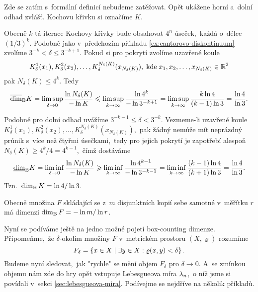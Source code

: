 \begin{example}\label{ex:kochova-krivka}
    Zde se zatím s~formální definicí nebudeme zatěžovat. Opět ukážene horní a~dolní odhad zvlášť. Kochovu křivku si označíme $K$.

    Obecně $k$-tá iterace Kochovy křivky bude obsahovat $4^n$ úseček,~každá o~délce $(1/3)^k$. Podobně jako v~předchozím příkladu \ref{ex:cantorovo-diskontinuum} zvolíme $3^{-k}<\delta\leqslant 3^{-k+1}$. Pokud si pro pokrytí zvolíme uzavřené koule
    \[K_\delta^1(x_1),K_\delta^2(x_2),\ldots,K_\delta^{N_\delta(K)}(x_{N_\delta(K)}),\;\text{kde}\;x_1,x_2,\ldots,x_{N_\delta(K)}\in\mathbb{R}^2\]
    pak $N_\delta(K)\leqslant 4^k$. Tedy
    \[\overline{\dim}_\textup{B}{K}=\limsup_{\delta\to 0}\dfrac{\ln{N_\delta(K)}}{-\ln{K}}\leqslant\limsup_{k\to\infty}\dfrac{\ln{4^k}}{-\ln{3^{-k+1}}}=\limsup_{k\to\infty}\dfrac{k\ln{4}}{(k-1)\ln{3}}=\dfrac{\ln{4}}{\ln{3}}.\]

    Podobně pro dolní odhad uvážíme $3^{-k-1}\leqslant\delta<3^{-k}$. Vezmeme-li uzavřené koule $K_\delta^1(x_1),K_\delta^2(x_2),\ldots,K_\delta^{N_\delta(K)}(x_{N_\delta(K)})$,~pak žádný nemůže mít neprázdný průnik s~více než čtyřmi úsečkami,~tedy pro jejich pokrytí je zapotřebí alespoň $N_\delta(K)\geqslant 4^k/4=4^{k-1}$,~čímž dostáváme
    \[\underline{\dim}_\textup{B}{K}=\liminf_{\delta\to 0}\dfrac{\ln{N_\delta(K)}}{-\ln{K}}\geqslant\liminf_{k\to\infty}\dfrac{\ln{4^{k-1}}}{-\ln{3^{-k-1}}}=\liminf_{k\to\infty}\dfrac{(k-1)\ln{4}}{(k+1)\ln{3}}=\dfrac{\ln{4}}{\ln{3}}.\]
    Tzn.~$\operatorname{dim_B}{K}=\ln{4}/\ln{3}$.
\end{example}
\begin{remark}
    Obecně množina $F$ skládající se z~$m$ disjunktních kopií sebe samotné v~měřítku $r$ má dimenzi $\operatorname{dim_B}{F}=-\ln{m}/\ln{r}$.
\end{remark}
Nyní se podíváme ještě na jedno možné pojetí box-counting dimenze. Připomeňme,~že $\delta$-okolím množiny $F$ v~metrickém prostoru $(X,\varrho)$ rozumíme
\[F_\delta=\left\{x\in X\mid\exists y\in X: \varrho(x,y)<\delta\right\}.\]
Budeme nyní sledovat,~jak "rychle" se mění objem $F_\delta$ pro $\delta\to 0$. A~se zmínkou objemu nám zde do hry opět vstupuje Lebesgueova míra $\lambda_n$,~o níž jsme si povídali v~sekci \ref{sec:lebesgueova-mira}. Podívejme se nejdříve na několik příkladů.
